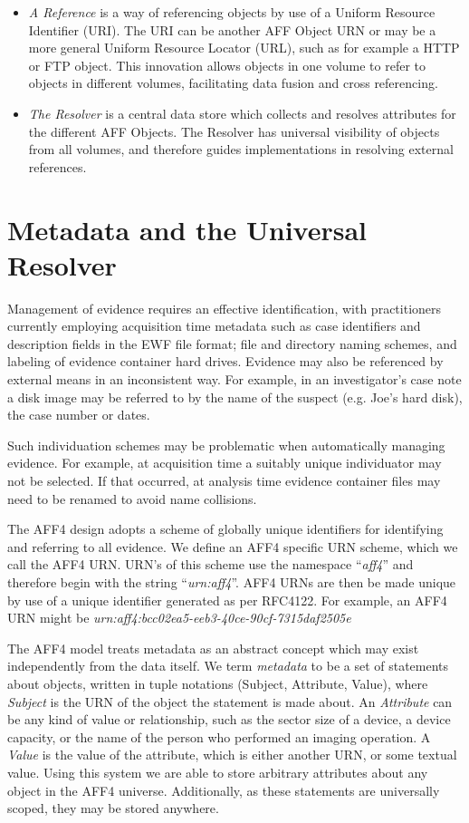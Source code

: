 \documentclass[10pt, conference]{IEEEtran}
\begin{document}
\begin{itemize}
\item \emph{A Reference} is a way of referencing objects by use
  of a Uniform Resource Identifier (URI). The URI can be another AFF
  Object URN or may be a more general Uniform Resource Locator (URL),
  such as for example a HTTP or FTP object. This innovation allows
  objects in one volume to refer to objects in different volumes,
  facilitating data fusion and cross referencing.

\item \emph{The Resolver} is a central data store which collects and resolves
  attributes for the different AFF Objects. The Resolver has universal
  visibility of objects from all volumes, and therefore guides
  implementations in resolving external references.
\end{itemize}

\section{Metadata and the Universal Resolver}
\label{resolver}

Management of evidence requires an effective identification, with
practitioners currently employing acquisition time metadata such as
case identifiers and description fields in the EWF file format; file
and directory naming schemes, and labeling of evidence container hard
drives. Evidence may also be referenced by external means in an
inconsistent way. For example, in an investigator's case note a disk
image may be referred to by the name of the suspect (e.g. Joe's hard
disk), the case number or dates.

Such individuation schemes may be problematic when automatically
managing evidence. For example, at acquisition time a suitably unique
individuator may not be selected. If that occurred, at analysis time
evidence container files may need to be renamed to avoid name
collisions.

The AFF4 design adopts a scheme of globally unique identifiers for
identifying and referring to all evidence. We define an AFF4 specific
URN scheme, which we call the AFF4 URN. URN's of this scheme use the
namespace\cite{RFC1737} ``\emph{aff4}'' and therefore begin with the 
string ``\emph{urn:aff4}''. AFF4 URNs are then be made unique by use of 
a unique identifier generated
as per RFC4122\cite{RFC4122}. For example, an AFF4 URN might be
\emph{urn:aff4:bcc02ea5-eeb3-40ce-90cf-7315daf2505e}

The AFF4 model treats metadata as an abstract concept which may exist
independently from the data itself. We term {\em metadata} to be a set
of statements about objects, written in tuple notations (Subject,
Attribute, Value), where {\em Subject} is the URN of the object the
statement is made about. An \emph{Attribute} can be any kind of value
or relationship, such as the sector size of a device, a device
capacity, or the name of the person who performed an imaging
operation. A \emph{Value} is the value of the attribute, which is
either another URN, or some textual value. Using this system we are
able to store arbitrary attributes about any object in the AFF4
universe. Additionally, as these statements are universally scoped,
they may be stored anywhere.
\end{document}
